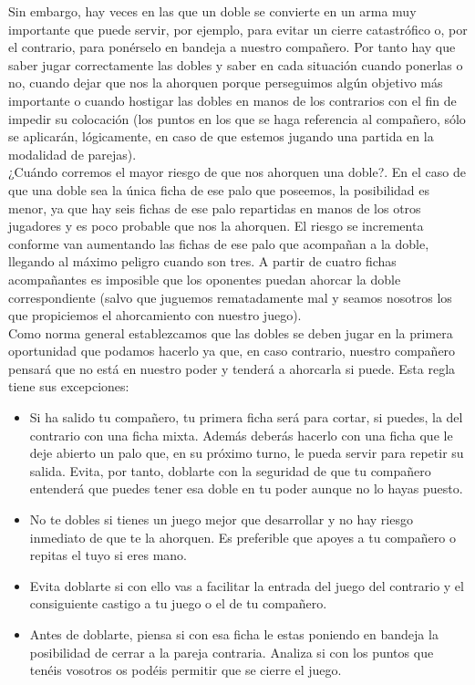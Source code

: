 Sin embargo, hay veces en las que un doble se convierte en un arma muy importante que puede servir, por ejemplo, para
evitar un cierre catastrófico o, por el contrario, para ponérselo en bandeja a nuestro compañero. Por tanto hay que saber
jugar correctamente las dobles y saber en cada situación cuando ponerlas o no, cuando dejar que nos la ahorquen porque
perseguimos algún objetivo más importante o cuando hostigar las dobles en manos de los contrarios con el fin de impedir
su colocación (los puntos en los que se haga referencia al compañero, sólo se aplicarán, lógicamente, en caso de que
estemos jugando una partida en la modalidad de parejas). \\

¿Cuándo corremos el mayor riesgo de que nos ahorquen una doble?. En el caso de que una doble sea la única ficha de
ese palo que poseemos, la posibilidad es menor, ya que hay seis fichas de ese palo repartidas en manos de los otros
jugadores y es poco probable que nos la ahorquen. El riesgo se incrementa conforme van aumentando las fichas de ese
palo que acompañan a la doble, llegando al máximo peligro cuando son tres. A partir de cuatro fichas acompañantes es
imposible que los oponentes puedan ahorcar la doble correspondiente (salvo que juguemos rematadamente mal y seamos
nosotros los que propiciemos el ahorcamiento con nuestro juego). \\

Como norma general establezcamos que las dobles se deben jugar en la primera oportunidad que podamos hacerlo ya que,
en caso contrario, nuestro compañero pensará que no está en nuestro poder y tenderá a ahorcarla si puede. Esta regla
tiene sus excepciones:
\begin{itemize}
    \item Si ha salido tu compañero, tu primera ficha será para cortar, si puedes, la del contrario con una ficha
        mixta. Además deberás hacerlo con una ficha que le deje abierto un palo que, en su próximo turno, le pueda
        servir para repetir su salida. Evita, por tanto, doblarte con la seguridad de que tu compañero entenderá que
        puedes tener esa doble en tu poder aunque no lo hayas puesto.
    \item No te dobles si tienes un juego mejor que desarrollar y no hay riesgo inmediato de que te la ahorquen. Es
        preferible que apoyes a tu compañero o repitas el tuyo si eres mano.
    \item Evita doblarte si con ello vas a facilitar la entrada del juego del contrario y el consiguiente castigo a
        tu juego o el de tu compañero.
    \item Antes de doblarte, piensa si con esa ficha le estas poniendo en bandeja la posibilidad de cerrar a la pareja
        contraria. Analiza si con los puntos que tenéis vosotros os podéis permitir que se cierre el juego.
\end{itemize}

